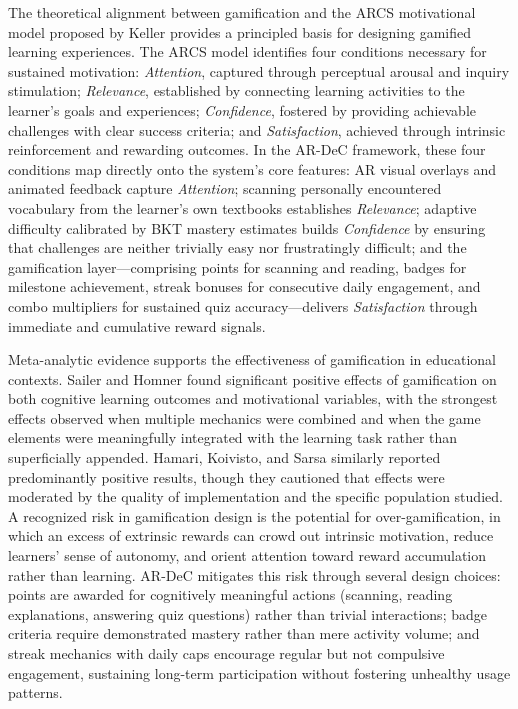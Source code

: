 The theoretical alignment between gamification and the ARCS motivational model proposed by Keller \cite{Keller2010} provides a principled basis for designing gamified learning experiences. The ARCS model identifies four conditions necessary for sustained motivation: \textit{Attention}, captured through perceptual arousal and inquiry stimulation; \textit{Relevance}, established by connecting learning activities to the learner's goals and experiences; \textit{Confidence}, fostered by providing achievable challenges with clear success criteria; and \textit{Satisfaction}, achieved through intrinsic reinforcement and rewarding outcomes. In the AR-DeC framework, these four conditions map directly onto the system's core features: AR visual overlays and animated feedback capture \textit{Attention}; scanning personally encountered vocabulary from the learner's own textbooks establishes \textit{Relevance}; adaptive difficulty calibrated by BKT mastery estimates builds \textit{Confidence} by ensuring that challenges are neither trivially easy nor frustratingly difficult; and the gamification layer---comprising points for scanning and reading, badges for milestone achievement, streak bonuses for consecutive daily engagement, and combo multipliers for sustained quiz accuracy---delivers \textit{Satisfaction} through immediate and cumulative reward signals.

Meta-analytic evidence supports the effectiveness of gamification in educational contexts. Sailer and Homner \cite{Sailer2017} found significant positive effects of gamification on both cognitive learning outcomes and motivational variables, with the strongest effects observed when multiple mechanics were combined and when the game elements were meaningfully integrated with the learning task rather than superficially appended. Hamari, Koivisto, and Sarsa \cite{Hamari2014} similarly reported predominantly positive results, though they cautioned that effects were moderated by the quality of implementation and the specific population studied. A recognized risk in gamification design is the potential for over-gamification, in which an excess of extrinsic rewards can crowd out intrinsic motivation, reduce learners' sense of autonomy, and orient attention toward reward accumulation rather than learning. AR-DeC mitigates this risk through several design choices: points are awarded for cognitively meaningful actions (scanning, reading explanations, answering quiz questions) rather than trivial interactions; badge criteria require demonstrated mastery rather than mere activity volume; and streak mechanics with daily caps encourage regular but not compulsive engagement, sustaining long-term participation without fostering unhealthy usage patterns.

